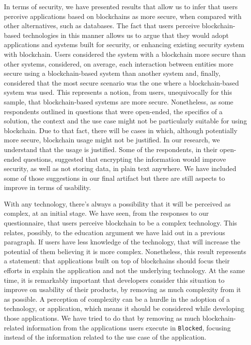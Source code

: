 In terms of security, we have presented results that allow us to infer that users perceive applications based on blockchains as more secure, when compared with other alternatives, such as databases. The fact that users perceive blockchain-based technologies in this manner allows us to argue that they would adopt applications and systems built for security, or enhancing existing security system with blockchain. Users considered the system with a blockchain more secure than other systems, considered, on average, each interaction between entities more secure using a blockchain-based system than another system and, finally, considered that the most secure scenario was the one where a blockchain-based system was used. This represents a notion, from users, unequivocally for this sample, that blockchain-based systems are more secure. Nonetheless, as some respondents outlined in questions that were open-ended, the specifics of a solution, the context and the use case might not be particularly suitable for using blockchain. Due to that fact, there will be cases in which, although potentially more secure, blockchain usage might not be justified. In our research, we understand that the usage is justified. Some of the respondents, in their open-ended questions, suggested that encrypting the information would improve security, as well as not storing data, in plain text anywhere. We have included some of those suggestions in our final artifact but there are still aspects to improve in terms of usability.

With any technology, there's always a possibility that it will be perceived as complex, at an initial stage. We have seen, from the responses to our questionnaire, that users perceive blockchain to be a complex technology. This relates, possibly, to the education argument we have laid out in a previous paragraph. If users have less knowledge of the technology, that will increase the potential of them believing it is more complex. Nonetheless, this result represents a statement: that applications built on top of blockchains should focus their efforts in explain the application and not the underlying technology. At the same time, it is remarkably important that developers consider this situation to improve on usability of their products, by removing as much complexity from it as possible. A perception of complexity can be a hurdle in the adoption of a technology, or application, which means it should be considered while developing those applications. We have tried to do that by removing as much blockchain-related information from the applications users execute in \texttt{Blocked}, focusing instead of the information related to the use case of the application.


